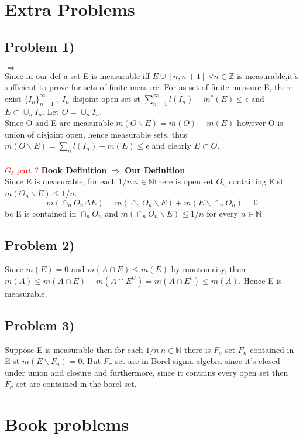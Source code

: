 \documentclass[paper=letter, fontsize=11pt]{scrartcl} %
\newcommand{\set}[1]{\{#1\}}
\begin{document}
\section{Extra Problems}
\subsection*{Problem 1)}
 $\Rightarrow$ \\
Since in our def a set E is measurable iff $E\cup [n,n+1] \; \forall n \in \mathbb{Z}$ is measurable,it's sufficient to prove for sets of finite measure. For as set of finite measure E, there exist $\set{I_n}_{n=1} ^ {\infty}$ , $I_n$ disjoint open set  st $ \sum_{n=1} ^{\infty} l(I_n) - m^*(E) \leq \epsilon$ and $E \subset \cup_n I_n$. Let $O=\cup_n I_n$. \\
Since O and E are measurable 
$m(O \backslash E)=m(O)-m(E)$ however O is union of disjoint open, hence measurable sets, thus
$m(O \backslash E)=\sum _n l(I_n)-m(E) \leq \epsilon$ and clearly $E \subset O$.\\
\\
\textcolor{red}{ $G_\delta$ part ?}
\textbf{Book Definition} $\Rightarrow$ \textbf{Our Definition}\\
Since E is measurable, for each $1/n \: n \in \mathbb{N}$there is open set $O_n$ containing E st $m(O_n\backslash E) \leq 1/n$. 
$$m(\cap_n O_n \Delta E )=m(\cap_n O_n \backslash E )+m(E \backslash \cap_n O_n) =0$$ bc E is contained in $\cap_n O_n$ and $m(\cap_n O_n\backslash E)\leq 1/n$ for every $n \in \mathbb{N}$
\subsection*{Problem 2)}
Since $m(E)=0$ and $m(A \cap E) \leq m(E)$ by montonicity, then  $m(A) \leq m(A \cap E) + m(A \cap E^C)=m(A \cap E^c) \leq m(A)$. Hence E is measurable.
\subsection*{Problem 3)}
Suppose E is measurable then for each $1/n \: n \in \mathbb{N}$ there is $F_\sigma$ set $F_n$ contained in E st $m(E \backslash F_n) =0$. But $F_\sigma$ set are in Borel sigma algebra since it's closed under union and closure and furthermore, since it contains every open set then $F_\sigma$ set are contained in the borel set. 
\section{Book problems}
\end{document}
